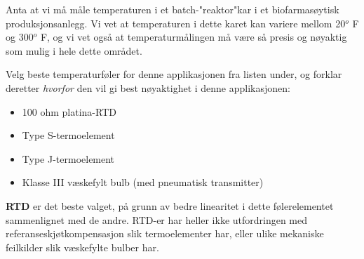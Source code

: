 

Anta at vi må måle temperaturen i et batch-"reaktor"kar i et biofarmasøytisk produksjonsanlegg. Vi vet at temperaturen i dette karet kan variere mellom 20$^{o}$ F og 300$^{o}$ F, og vi vet også at temperaturmålingen må være så presis og nøyaktig som mulig i hele dette området.

Velg beste temperaturføler for denne applikasjonen fra listen under, og forklar deretter {\it hvorfor} den vil gi best nøyaktighet i denne applikasjonen:

\begin{itemize}
\item{} 100 ohm platina-RTD
\item{} Type S-termoelement
\item{} Type J-termoelement
\item{} Klasse III væskefylt bulb (med pneumatisk transmitter)
\end{itemize}







{\bf RTD} er det beste valget, på grunn av bedre linearitet i dette følerelementet sammenlignet med de andre. RTD-er har heller ikke utfordringen med referanseskjøtkompensasjon slik termoelementer har, eller ulike mekaniske feilkilder slik væskefylte bulber har.










